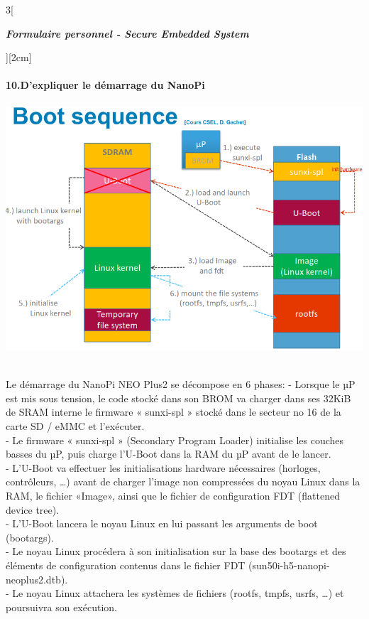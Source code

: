 \begin{multicols}{3}[\centerline{ \large\em \textbf{Formulaire personnel - Secure Embedded System}}][2cm]
\paragraph*{10.D'expliquer le démarrage du NanoPi\\}
\begin{minipage}{\linewidth}
	\centering
    \includegraphics[width =0.8\columnwidth]{images/4.png}
\end{minipage}\\
Le démarrage du NanoPi NEO Plus2 se décompose en 6 phases:
- Lorsque le µP est mis sous tension, le code stocké dans son BROM va charger
dans ses 32KiB de SRAM interne le firmware « sunxi-spl » stocké dans le
secteur no 16 de la carte SD / eMMC et l’exécuter.\\
- Le firmware « sunxi-spl » (Secondary Program Loader) initialise les couches
basses du µP, puis charge l’U-Boot dans la RAM du µP avant de le lancer.\\
- L’U-Boot va effectuer les initialisations hardware nécessaires (horloges,
contrôleurs, …) avant de charger l’image non compressées du noyau Linux dans
la RAM, le fichier «Image», ainsi que le fichier de configuration FDT (flattened device tree).\\
- L’U-Boot lancera le noyau Linux en lui passant les arguments de boot (bootargs).\\
- Le noyau Linux procédera à son initialisation sur la base des bootargs et des éléments de configuration contenus dans le fichier FDT (sun50i-h5-nanopi-neoplus2.dtb).\\
- Le noyau Linux attachera les systèmes de fichiers (rootfs, tmpfs, usrfs, …) et poursuivra son exécution.

\end{multicols}

